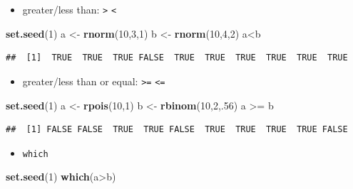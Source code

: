 \documentclass[]{article}
\def\tightlist{}
\newenvironment{Shaded}{\begin{snugshade}}{\end{snugshade}}
\newcommand{\KeywordTok}[1]{\textcolor[rgb]{0.13,0.29,0.53}{\textbf{{#1}}}}
\newcommand{\DecValTok}[1]{\textcolor[rgb]{0.00,0.00,0.81}{{#1}}}
\newcommand{\StringTok}[1]{\textcolor[rgb]{0.31,0.60,0.02}{{#1}}}
\newcommand{\NormalTok}[1]{{#1}}
\numberwithin{equation}{section}
\begin{document}
\begin{itemize}
\tightlist
\item
  greater/less than: \texttt{\textgreater{}} \texttt{\textless{}}
\end{itemize}

\begin{Shaded}
\begin{Highlighting}[]
\KeywordTok{set.seed}\NormalTok{(}\DecValTok{1}\NormalTok{)}
\NormalTok{a <-}\StringTok{ }\KeywordTok{rnorm}\NormalTok{(}\DecValTok{10}\NormalTok{,}\DecValTok{3}\NormalTok{,}\DecValTok{1}\NormalTok{)}
\NormalTok{b <-}\StringTok{ }\KeywordTok{rnorm}\NormalTok{(}\DecValTok{10}\NormalTok{,}\DecValTok{4}\NormalTok{,}\DecValTok{2}\NormalTok{)}
\NormalTok{a<b}
\end{Highlighting}
\end{Shaded}

\begin{verbatim}
##  [1]  TRUE  TRUE  TRUE FALSE  TRUE  TRUE  TRUE  TRUE  TRUE  TRUE
\end{verbatim}

\begin{itemize}
\tightlist
\item
  greater/less than or equal: \texttt{\textgreater{}=}
  \texttt{\textless{}=}
\end{itemize}

\begin{Shaded}
\begin{Highlighting}[]
\KeywordTok{set.seed}\NormalTok{(}\DecValTok{1}\NormalTok{)}
\NormalTok{a <-}\StringTok{ }\KeywordTok{rpois}\NormalTok{(}\DecValTok{10}\NormalTok{,}\DecValTok{1}\NormalTok{)}
\NormalTok{b <-}\StringTok{ }\KeywordTok{rbinom}\NormalTok{(}\DecValTok{10}\NormalTok{,}\DecValTok{2}\NormalTok{,.}\DecValTok{56}\NormalTok{)}
\NormalTok{a >=}\StringTok{ }\NormalTok{b}
\end{Highlighting}
\end{Shaded}

\begin{verbatim}
##  [1] FALSE FALSE  TRUE  TRUE FALSE  TRUE  TRUE  TRUE  TRUE FALSE
\end{verbatim}

\begin{itemize}
\tightlist
\item
  \texttt{which}
\end{itemize}

\begin{Shaded}
\begin{Highlighting}[]
\KeywordTok{set.seed}\NormalTok{(}\DecValTok{1}\NormalTok{)}
\KeywordTok{which}\NormalTok{(a>b)}
\end{Highlighting}
\end{Shaded}
\end{document}
